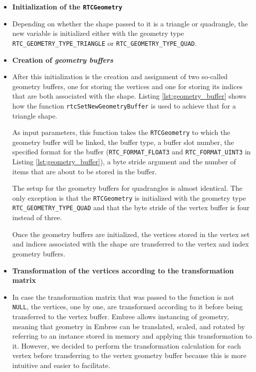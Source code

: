 \begin{itemize}
	\setlength\itemsep{0.05em}
	
	\item \textbf{Initialization of the \texttt{RTCGeometry}}
	\item[] Depending on whether the shape passed to it is a triangle or quadrangle, the new  variable is initialized either with the geometry type \texttt{RTC\_GEOMETRY\_TYPE\_TRIANGLE} or \texttt{RTC\_GEOMETRY\_TYPE\_QUAD}.
	\\
	
	\item \textbf{Creation of \emph{geometry buffers}}
	\item[] After this initialization is the creation and assignment of two so-called geometry buffers, one for storing the vertices and one for storing its indices that are both associated with the shape. Listing \ref{lst:geometry_buffer} shows how the function \texttt{rtcSetNewGeometryBuffer} is used to achieve that for a triangle shape.
	
	As input parameters, this function takes the \texttt{RTCGeometry} to which the geometry buffer will be linked, the buffer type, a buffer slot number, the specified format for the buffer (\texttt{RTC\_FORMAT\_FLOAT3} and \texttt{RTC\_FORMAT\_UINT3} in Listing \ref{lst:geometry_buffer}), a byte stride argument and the number of items that are about to be stored in the buffer. 
	
	The setup for the geometry buffers for quadrangles is almost identical. The only exception is that the \texttt{RTCGeometry} is initialized with the geometry type \texttt{RTC\_GEOMETRY\_TYPE\_QUAD} and that the byte stride of the vertex buffer is four instead of three.
	
	Once the geometry buffers are initialized, the vertices stored in the vertex set and indices associated with the shape are transferred to the vertex and index geometry buffers.
	\\
	\newpage %
	
	\item \textbf{Transformation of the vertices according to the transformation matrix}
	\item[] In case the transformation matrix that was passed to the function is not \texttt{NULL}, the vertices, one by one, are transformed according to it before being transferred to the vertex buffer. Embree allows instancing of geometry, meaning that geometry in Embree can be translated, scaled, and rotated by referring to an instance stored in memory and applying this transformation to it. However, we decided to perform the transformation calculation for each vertex before transferring to the vertex geometry buffer because this is more intuitive and easier to facilitate.
	
\end{itemize}

